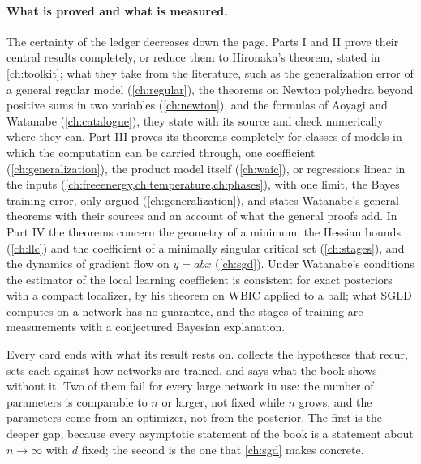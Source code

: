 \begin{refsection}
\paragraph{What is proved and what is measured.} The certainty of the ledger decreases down the page. Parts I and II prove their central results completely, or reduce them to Hironaka's theorem, stated in \cref{ch:toolkit}; what they take from the literature, such as the generalization error of a general regular model (\cref{ch:regular}), the theorems on Newton polyhedra beyond positive sums in two variables (\cref{ch:newton}), and the formulas of Aoyagi and Watanabe (\cref{ch:catalogue}), they state with its source and check numerically where they can. Part III proves its theorems completely for classes of models in which the computation can be carried through, one coefficient (\cref{ch:generalization}), the product model itself (\cref{ch:waic}), or regressions linear in the inputs (\cref{ch:freeenergy,ch:temperature,ch:phases}), with one limit, the Bayes training error, only argued (\cref{ch:generalization}), and states Watanabe's general theorems with their sources and an account of what the general proofs add. In Part IV the theorems concern the geometry of a minimum, the Hessian bounds (\cref{ch:llc}) and the coefficient of a minimally singular critical set (\cref{ch:stages}), and the dynamics of gradient flow on $y=abx$ (\cref{ch:sgd}). Under Watanabe's conditions the estimator of the local learning coefficient is consistent for exact posteriors with a compact localizer, by his theorem on WBIC applied to a ball; what SGLD computes on a network has no guarantee, and the stages of training are measurements with a conjectured Bayesian explanation.


Every card ends with what its result rests on.  collects the hypotheses that recur, sets each against how networks are trained, and says what the book shows without it. Two of them fail for every large network in use: the number of parameters is comparable to $n$ or larger, not fixed while $n$ grows, and the parameters come from an optimizer, not from the posterior. The first is the deeper gap, because every asymptotic statement of the book is a statement about $n\to\infty$ with $d$ fixed; the second is the one that \cref{ch:sgd} makes concrete.


\end{refsection}

